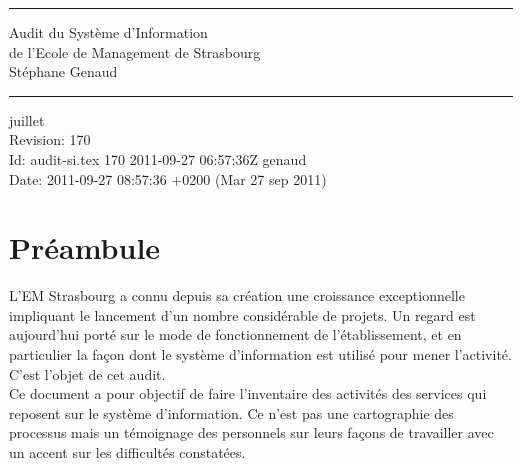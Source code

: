 \documentclass{book}
\begin{document}
\newcommand{\motcle}[1]{\index{#1}{#1}}
\newcommand{\clecommun}{stockage partagé en réseau\xspace}
\newcommand{\sre}{service relations entreprises\xspace}
\newcommand{\srh}{service ressources humaines\xspace}
\newcommand{\sop}{service organisation et process\xspace}
\newcommand{\scom}{service communication\xspace}
\newcommand{\sconc}{service concours\xspace}
\newcommand{\sintl}{service international\xspace}
\newcommand{\CK}{Christos Karacostas\xspace}
\newcommand{\NB}{Nicolas Beyhurst\xspace}


\thispagestyle{empty}
\rhead[]{}
\pagestyle{fancy}
\setlength{\parindent}{0mm}
\setlength{\parskip}{0mm}
\rule{\linewidth}{1mm}
\begin{center}
\Large{Audit du Système d'Information}\\[5mm]
\Large{de l'Ecole de Management de Strasbourg}\\[5mm]
\large{Stéphane Genaud}
\rule{\linewidth}{1mm}
\end{center}
\begin{center}
juillet  \\
\textrm{
Revision: 170 \\
Id: audit-si.tex 170 2011-09-27 06:57:36Z genaud\\
Date: 2011-09-27 08:57:36 +0200 (Mar 27 sep 2011)\\
}
\end{center}

\tableofcontents
\newpage


\chapter*{Préambule}

L'EM  Strasbourg  a  connu  depuis sa  création  une  croissance  exceptionnelle
impliquant  le lancement  d'un nombre  considérable  de projets.  Un regard  est
aujourd'hui  porté sur  le  mode  de fonctionnement  de  l'établissement, et  en
particulier  la façon  dont  le  système d'information  est  utilisé pour  mener
l'activité. C'est l'objet de cet audit.\\

Ce document a pour objectif de faire l'inventaire des activités des services qui
reposent  sur  le système  d'information.  Ce  n'est  pas une  cartographie  des
processus mais un témoignage des personnels  sur leurs façons de travailler avec
un accent sur les difficultés constatées.\\
\end{document}
